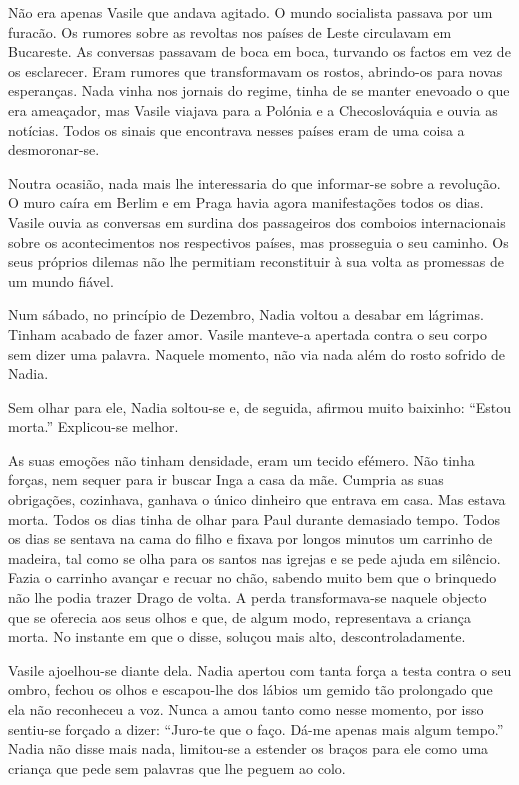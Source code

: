 Não era apenas Vasile que andava agitado. O mundo socialista passava por
um furacão. Os rumores sobre as revoltas nos países de Leste circulavam
em Bucareste. As conversas passavam de boca em boca, turvando os factos
em vez de os esclarecer. Eram rumores que transformavam os rostos,
abrindo-os para novas esperanças. Nada vinha nos jornais do regime,
tinha de se manter enevoado o que era ameaçador, mas Vasile viajava para
a Polónia e a Checoslováquia e ouvia as notícias. Todos os sinais que
encontrava nesses países eram de uma coisa a desmoronar-se.

Noutra ocasião, nada mais lhe interessaria do que informar-se sobre a
revolução. O muro caíra em Berlim e em Praga havia agora manifestações
todos os dias. Vasile ouvia as conversas em surdina dos passageiros dos
comboios internacionais sobre os acontecimentos nos respectivos
países, mas prosseguia o seu caminho. Os seus próprios dilemas não lhe
permitiam reconstituir à sua volta as promessas de um mundo fiável.

Num sábado, no princípio de Dezembro, Nadia voltou a desabar em
lágrimas. Tinham acabado de fazer amor. Vasile manteve-a apertada contra
o seu corpo sem dizer uma palavra. Naquele momento, não via nada além do
rosto sofrido de Nadia.

Sem olhar para ele, Nadia soltou-se e, de seguida, afirmou muito
baixinho: ``Estou morta.'' Explicou-se melhor.

As suas emoções não tinham densidade, eram um tecido efémero. Não tinha
forças, nem sequer para ir buscar Inga a casa da mãe. Cumpria as suas
obrigações, cozinhava, ganhava o único dinheiro que entrava em casa. Mas
estava morta. Todos os dias tinha de olhar para Paul durante demasiado
tempo. Todos os dias se sentava na cama do filho e fixava por longos
minutos um carrinho de madeira, tal como se olha para os santos nas
igrejas e se pede ajuda em silêncio. Fazia o carrinho avançar e recuar
no chão, sabendo muito bem que o brinquedo não lhe podia trazer Drago de
volta. A perda transformava-se naquele objecto que se oferecia aos seus
olhos e que, de algum modo, representava a criança morta. No instante em
que o disse, soluçou mais alto, descontroladamente.

Vasile ajoelhou-se diante dela. Nadia apertou com tanta
força a testa contra o seu ombro, fechou os olhos e escapou-lhe dos
lábios um gemido tão prolongado que ela não reconheceu a voz. Nunca a
amou tanto como nesse momento, por isso sentiu-se forçado a dizer:
``Juro-te que o faço. Dá-me apenas mais algum tempo.'' Nadia não disse
mais nada, limitou-se a estender os braços para ele como uma criança que
pede sem palavras que lhe peguem ao colo.


